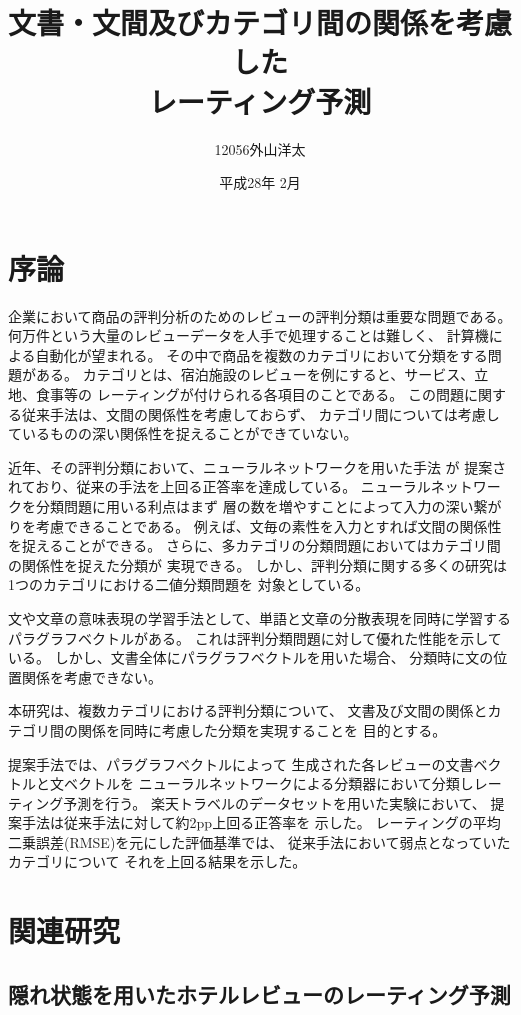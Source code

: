 \documentclass{ttithesis}
\title{文書・文間及びカテゴリ間の関係を考慮した\\レーティング予測}
\author{12056\hspace{16ex}外山洋太}
\date{平成28年 2月}
\begin{document}
\section{序論}

企業において商品の評判分析のためのレビューの評判分類は重要な問題である。
何万件という大量のレビューデータを人手で処理することは難しく、
計算機による自動化が望まれる。
その中で商品を複数のカテゴリにおいて分類をする問題がある。
カテゴリとは、宿泊施設のレビューを例にすると、サービス、立地、食事等の
レーティングが付けられる各項目のことである。
この問題に関する従来手法\cite{fujitani15}は、文間の関係性を考慮しておらず、
カテゴリ間については考慮しているものの深い関係性を捉えることができていない。

近年、その評判分類において、ニューラルネットワークを用いた手法
\cite{nal14,rie14,duyu15}が
提案されており、従来の手法を上回る正答率を達成している。
ニューラルネットワークを分類問題に用いる利点はまず
層の数を増やすことによって入力の深い繋がりを考慮できることである。
例えば、文毎の素性を入力とすれば文間の関係性を捉えることができる。
さらに、多カテゴリの分類問題においてはカテゴリ間の関係性を捉えた分類が
実現できる。
しかし、評判分類に関する多くの研究は1つのカテゴリにおける二値分類問題を
対象としている。

文や文章の意味表現の学習手法として、単語と文章の分散表現を同時に学習する
パラグラフベクトル\cite{quoc14}がある。
これは評判分類問題に対して優れた性能を示している。
しかし、文書全体にパラグラフベクトルを用いた場合、
分類時に文の位置関係を考慮できない。

本研究は、複数カテゴリにおける評判分類について、
文書及び文間の関係とカテゴリ間の関係を同時に考慮した分類を実現することを
目的とする。

提案手法では、パラグラフベクトル\cite{quoc14}によって
生成された各レビューの文書ベクトルと文ベクトルを
ニューラルネットワークによる分類器において分類しレーティング予測を行う。
楽天トラベルのデータセットを用いた実験において、
提案手法は従来手法\cite{fujitani15}に対して約2pp上回る正答率を
示した。
レーティングの平均二乗誤差(RMSE)を元にした評価基準では、
従来手法\cite{fujitani15}において弱点となっていたカテゴリについて
それを上回る結果を示した。



\section{関連研究}

\subsection{隠れ状態を用いたホテルレビューのレーティング予測}
\end{document}
